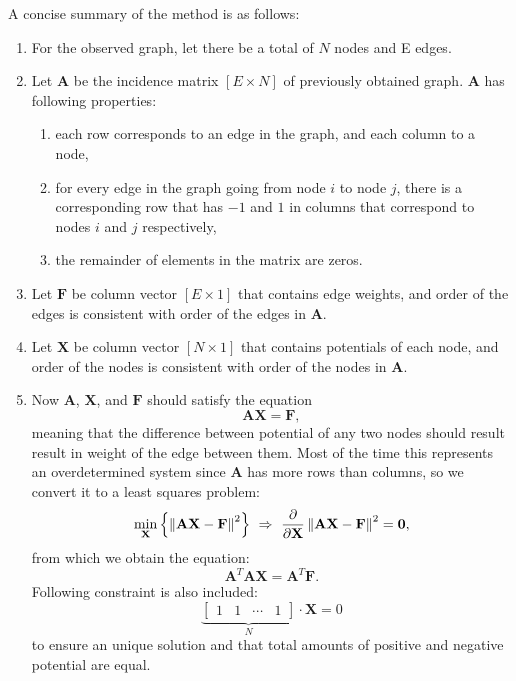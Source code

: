 \documentclass[letterpaper, 10 pt, conference]{ieeeconf}
\begin{document}
  A concise summary of the method is as follows:
  \begin{enumerate}
    \item For the observed graph, let there be a total of $N$ nodes and E edges.
    \item Let $\mathbf{A}$ be the incidence matrix $\left[E \times N\right]$ of previously obtained graph. $\mathbf{A}$ has following properties:
    \begin{enumerate}
      \item each row corresponds to an edge in the graph, and each column to a node,
      \item for every edge in the graph going from node $i$ to node $j$, there is a corresponding row that has $-1$ and $1$ in columns that correspond to nodes $i$ and $j$ respectively,
      \item the remainder of elements in the matrix are zeros.
    \end{enumerate}
    \item Let $\mathbf{F}$ be column vector $\left[E \times 1\right]$ that contains edge weights, and order of the edges is consistent with order of the edges in $\mathbf{A}$.
    
    \item Let $\mathbf{X}$ be column vector $\left[N \times 1\right]$ that contains potentials of each node, and order of the nodes is consistent with order of the nodes in $\mathbf{A}$.
    
    \item Now $\mathbf{A}$, $\mathbf{X}$, and $\mathbf{F}$ should satisfy the equation
    \begin{equation}
    \label{eq:flowover}
    \mathbf{A} \mathbf{X} = \mathbf{F},
    \end{equation}
    meaning that the difference between potential of any two nodes should result result in weight of the edge between them.
    Most of the time this represents an overdetermined system since $\mathbf{A}$ has more rows than columns, so we convert it to a least squares problem:
    \begin{equation}
    \begin{gathered}
    \min_{\mathbf{X}} \left\{ \left \lVert \mathbf{A} \mathbf{X} - \mathbf{F}\textsl{} \right \rVert ^ 2 \right\}\ \Rightarrow\ 
    \frac{\partial}{\partial \mathbf{X}} \left \lVert \mathbf{A} \mathbf{X} - \mathbf{F} \right \rVert ^ 2 = \mathbf{0},
    \end{gathered}
    \end{equation}
    from which we obtain the equation:
    \begin{equation}
    \label{eq:flow}
    \mathbf{A}^{T} \mathbf{A} \mathbf{X} = \mathbf{A}^{T} \mathbf{F}.
    \end{equation}
    Following constraint is also included:
    \begin{equation}
    \label{eq:sumiszero}
    \underbrace{\begin{bmatrix} 1 & 1 & \cdots & 1 \end{bmatrix}}_{N} \cdot \mathbf{X} = 0
    \end{equation}
    to ensure an unique solution and that total amounts of positive and negative potential are equal.
    

\end{enumerate}
\end{document}
